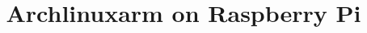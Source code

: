\documentclass[journal,12pt,twocolumn]{IEEEtran}
\begin{document}

\makeatletter
{}
\makeatother

\let\StandardTheFigure\thefigure
\let\StandardTheTable\thetable
\renewcommand{\thetable}{\theproblem}




\def\putbox#1#2#3{\makebox[0in][l]{\makebox[#1][l]{}\raisebox{\baselineskip}[0in][0in]{\raisebox{#2}[0in][0in]{#3}}}}
     \def\rightbox#1{\makebox[0in][r]{#1}}
     \def\centbox#1{\makebox[0in]{#1}}
     \def\topbox#1{\raisebox{-\baselineskip}[0in][0in]{#1}}
     \def\midbox#1{\raisebox{-0.5\baselineskip}[0in][0in]{#1}}

\vspace{3cm}

\title{ 
Archlinuxarm on Raspberry Pi 
}



%
%
%
\end{document}
